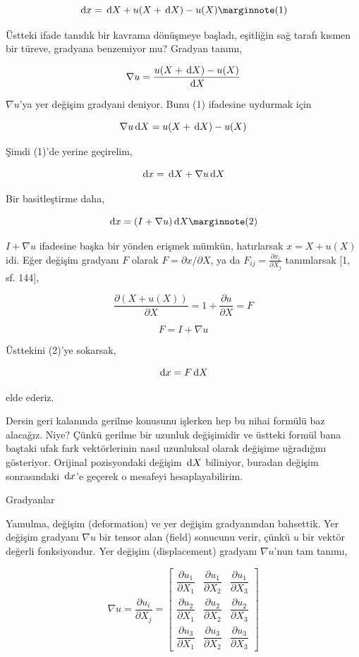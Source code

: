 \documentclass[12pt,fleqn]{article}\usepackage{../../common}
\begin{document}
$$
\ud x = \ud X + u(X+\ud X) - u(X)
\mlabel{1}
$$

Üstteki ifade tanıdık bir kavrama dönüşmeye başladı, eşitliğin sağ tarafı kısmen
bir türeve, gradyana benzemiyor mu? Gradyan tanımı,

$$
\nabla u = \frac{u(X+\,\mathrm{d} X) - u(X)}{\,\mathrm{d} X}
$$

$\nabla u$'ya yer değişim gradyani deniyor.  Bunu (1) ifadesine uydurmak için 

$$
\nabla u \,\mathrm{d} X = u(X+\,\mathrm{d} X) - u(X)
$$


Şimdi (1)'de yerine geçirelim,

$$
\,\mathrm{d} x = \,\mathrm{d} X + \nabla u \,\mathrm{d} X
$$

Bir basitleştirme daha,

$$
\ud x = (I + \nabla u) \ud X
\mlabel{2}
$$

$I + \nabla u$ ifadesine başka bir yönden erişmek mümkün, hatırlarsak
$x = X + u(X)$ idi. Eğer değişim gradyanı $F$ olarak $F = \partial x / \partial X$,
ya da $F_{ij} = \frac{\partial x_i}{\partial X_j}$ tanımlarsak [1, sf. 144], 

$$
\frac{\partial (X + u(X))}{\partial X} = 1  + \frac{\partial u}{\partial X} = F
$$

$$
F = I + \nabla u
$$

Üsttekini (2)'ye sokarsak,

$$
\,\mathrm{d} x = F \,\mathrm{d} X
$$

elde ederiz.

Dersin geri kalanında gerilme konusunu işlerken hep bu nihai formülü baz
alacağız. Niye?  Çünkü gerilme bir uzunluk değişimidir ve üstteki formül bana
baştaki ufak fark vektörlerinin nasıl uzunluksal olarak değişime uğradığını
gösteriyor. Orijinal pozisyondaki değişim $\,\mathrm{d} X$ biliniyor, buradan değişim
sonrasındaki $\,\mathrm{d} x$'e geçerek o mesafeyi hesaplayabilirim.

Gradyanlar

Yamulma, değişim (deformation) ve yer değişim gradyanından bahsettik. Yer
değişim gradyanı $\nabla u$ bir tensor alan (field) sonucunu verir, çünkü $u$
bir vektör değerli fonksiyondur. Yer değişim (displacement) gradyanı
$\nabla u$'nun tam tanımı,

$$
\renewcommand*{\arraystretch}{2.5}
\nabla u = \frac{\partial u_i}{\partial X_j} =
\left[\begin{array}{ccc}
\dfrac{\partial u_1}{\partial X_1} & \dfrac{\partial u_1}{\partial X_2} & \dfrac{\partial u_1}{\partial X_3} \\
\dfrac{\partial u_2}{\partial X_1} & \dfrac{\partial u_2}{\partial X_2} & \dfrac{\partial u_2}{\partial X_3} \\
\dfrac{\partial u_3}{\partial X_1} & \dfrac{\partial u_3}{\partial X_2} & \dfrac{\partial u_3}{\partial X_3} 
\end{array}\right]
$$
\end{document}
